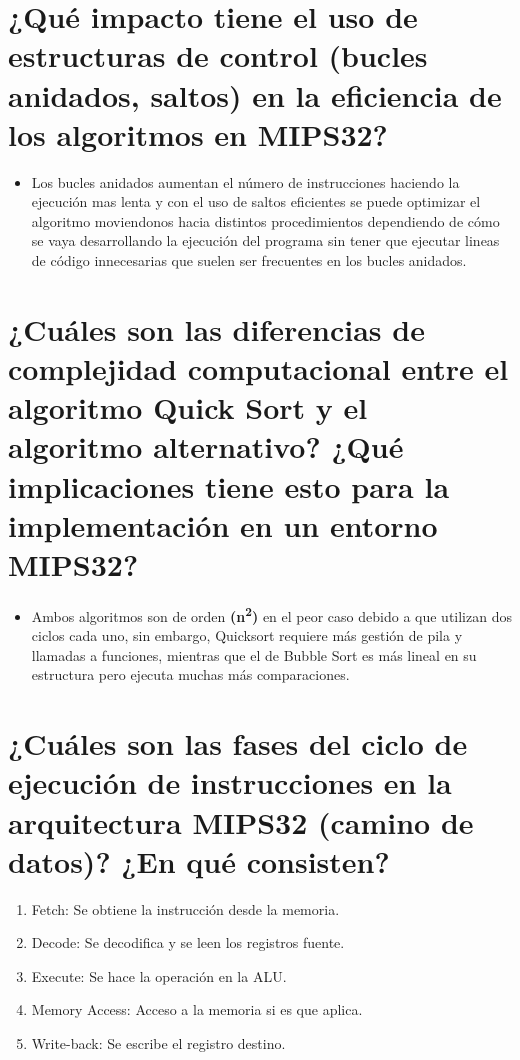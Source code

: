 \documentclass[12pt]{article}
\begin{document}
\section{¿Qué impacto tiene el uso de estructuras de control (bucles anidados, saltos) en la 
eficiencia de los algoritmos en MIPS32?}
\begin{itemize}
    \item Los bucles anidados aumentan el número de instrucciones haciendo la ejecución mas lenta y con el uso de saltos eficientes se puede optimizar el algoritmo moviendonos hacia distintos procedimientos dependiendo de cómo se vaya desarrollando la ejecución del programa sin tener que ejecutar lineas de código innecesarias que suelen ser frecuentes en los bucles anidados.
\end{itemize}

\section{¿Cuáles son las diferencias de complejidad computacional entre el algoritmo Quick Sort 
y el algoritmo alternativo? ¿Qué implicaciones tiene esto para la implementación en un 
entorno MIPS32?}
\begin{itemize}
    \item Ambos algoritmos son de orden \textbf{(n\textsuperscript{2})} en el peor caso debido a que utilizan dos ciclos cada uno, sin embargo, Quicksort requiere más gestión de pila y llamadas a funciones, mientras que el de Bubble Sort es más lineal en su estructura pero ejecuta muchas más comparaciones.
    
\end{itemize} 

\section{¿Cuáles son las fases del ciclo de ejecución de instrucciones en la arquitectura MIPS32 
(camino de datos)? ¿En qué consisten?}
\begin{enumerate}
    \item Fetch: Se obtiene la instrucción desde la memoria.
    \item Decode: Se decodifica y se leen los registros fuente.
    \item Execute: Se hace la operación en la ALU.
    \item Memory Access: Acceso a la memoria si es que aplica.
    \item Write-back: Se escribe el registro destino.
\end{enumerate}
\end{document}
